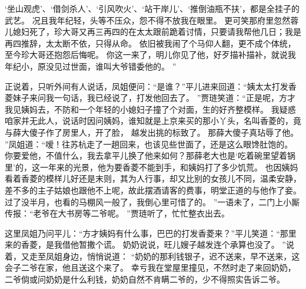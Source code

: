 ‘坐山观虎’、‘借剑杀人’、‘引风吹火’、‘站干岸儿’、‘推倒油瓶不扶’，都是全挂子的武艺。
况且我年纪轻，头等不压众，怨不得不放我在眼里。
更可笑那府里忽然蓉儿媳妇死了，珍大哥又再三再四的在太太跟前跪着讨情，只要请我帮他几日；我是再四推辞，太太断不依，只得从命。
依旧被我闹了个马仰人翻，更不成个体统，至今珍大哥还抱怨后悔呢。
你这一来了，明儿你见了他，好歹描补描补，就说我年纪小，原没见过世面，谁叫大爷错委他的。
”\par
正说着，只听外间有人说话，凤姐便问：“是谁？”平儿进来回道：“姨太太打发香菱妹子来问我一句话，我已经说了，打发他回去了。
”贾琏笑道：“正是呢，方才我见姨妈去，不防和一个年轻的小媳妇子撞了个对面，生的好齐整模样。
我疑惑咱家并无此人，说话时因问姨妈，谁知就是上京来买的那小丫头，名叫香菱的，竟与薛大傻子作了房里人，开了脸，
越发出挑的标致了。
那薛大傻子真玷辱了他。
”凤姐道：“嗳！往苏杭走了一趟回来，也该见些世面了，还是这么眼馋肚饱的。
你要爱他，不值什么，我去拿平儿换了他来如何？那薛老大也是‘吃着碗里望着锅里’的，这一年来的光景，他为要香菱不能到手，和姨妈打了多少饥荒。
也因姨妈看着香菱的模样儿好还是末则，其为人行事，却又比别的女孩儿不同，温柔安静，差不多的主子姑娘也跟他不上呢，故此摆酒请客的费事，明堂正道的与他作了妾。
过了没半月，也看的马棚风一般了，我倒心里可惜了的。
”一语未了，二门上小厮传报：“老爷在大书房等二爷呢。
”贾琏听了，忙忙整衣出去。
\par
这里凤姐乃问平儿：“方才姨妈有什么事，巴巴的打发香菱来？”平儿笑道：“那里来的香菱，是我借他暂撒个谎。
奶奶说说，旺儿嫂子越发连个承算也没了。
”说着，又走至凤姐身边，悄悄说道：
“奶奶的那利钱银子，迟不送来，早不送来，这会子二爷在家，他且送这个来了。
幸亏我在堂屋里撞见，不然时走了来回奶奶，二爷倘或问奶奶是什么利钱，奶奶自然不肯瞒二爷的，少不得照实告诉二爷。
